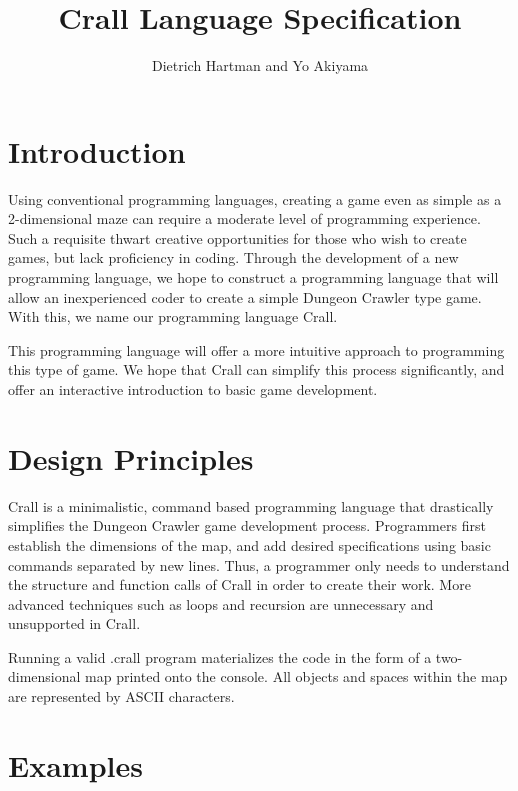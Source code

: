 \documentclass[10pt]{article}
\author{Dietrich Hartman and Yo Akiyama}
\title{Crall Language Specification}
\begin{document}
\maketitle
        \section{Introduction}
        
        Using conventional programming languages, creating a game even as simple as a 2-dimensional maze can require a moderate level of programming experience. Such a requisite thwart creative opportunities for those who wish to create games, but lack proficiency in coding. Through the development of a new programming language, we hope to construct a programming language that will allow an inexperienced coder to create a simple Dungeon Crawler type game. With this, we name our programming language Crall.
 
        This programming language will offer a more intuitive approach to programming this type of game. We hope that Crall can simplify this process significantly, and offer an interactive introduction to basic game development.
        
        \section{Design Principles}
        
         Crall is a minimalistic, command based programming language that drastically simplifies the Dungeon Crawler game development process. Programmers first establish the dimensions of the map, and add desired specifications using basic commands separated by new lines. Thus, a programmer only needs to understand the structure and function calls of Crall in order to create their work. More advanced techniques such as loops and recursion are unnecessary and unsupported in Crall.
         
         Running a valid .crall program materializes the code in the form of a two-dimensional map printed onto the console. All objects and spaces within the map are represented by ASCII characters. 

    \section{Examples}
    
\end{document}
